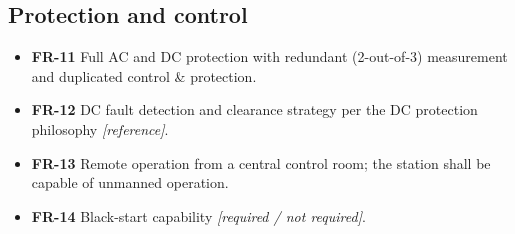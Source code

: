 \subsection{Protection and control}
\begin{itemize}\setlength{\itemsep}{0.25em}
  \item \textbf{FR-11} Full AC and DC protection with redundant (2-out-of-3)
        measurement and duplicated control \& protection.
  \item \textbf{FR-12} DC fault detection and clearance strategy per the DC
        protection philosophy \emph{[reference]}.
  \item \textbf{FR-13} Remote operation from a central control room; the station
        shall be capable of unmanned operation.
  \item \textbf{FR-14} Black-start capability \emph{[required / not required]}.
\end{itemize}
